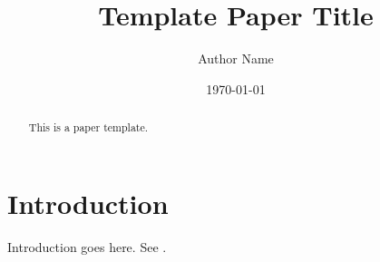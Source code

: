 \documentclass[11pt,a4paper]{article}
\title{Template Paper Title}
\author{Author Name}
\date{\today}
\begin{document}
\maketitle

\begin{abstract}
This is a paper template.
\end{abstract}

\section{Introduction}
Introduction goes here. See \cite{example_ref}.



\end{document}
